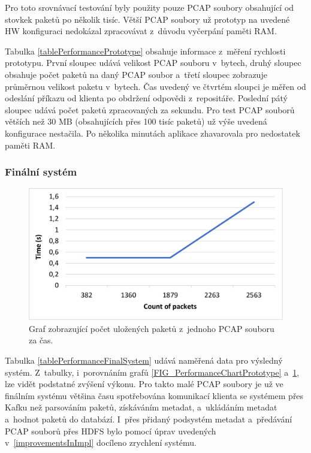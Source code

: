 \noindent Pro toto srovnávací testování byly použity pouze PCAP soubory obsahující od stovkek paketů po několik tisíc. Větší PCAP soubory už prototyp na uvedené HW konfiguraci nedokázal zpracovávat z~důvodu vyčerpání paměti RAM.

Tabulka \ref{tablePerformancePrototype} obsahuje informace z~měření rychlosti prototypu. První sloupec udává velikost PCAP souboru v~bytech, druhý sloupec obsahuje počet paketů na daný PCAP soubor a~třetí sloupec zobrazuje průměrnou velikost paketu v~bytech. Čas uvedený ve čtvrtém sloupci je měřen od odeslání příkazu od klienta po obdržení odpovědi z~repositáře. Poslední pátý sloupec udává počet paketů zpracovaných za sekundu. Pro test PCAP souborů větších než 30 MB (obsahujících přes 100 tisíc paketů) už výše uvedená konfigurace nestačila. Po několika minutách aplikace zhavarovala pro nedostatek paměti RAM.

\subsubsection{Finální systém}

\begin{figure}[!h]
    \centering
    \includegraphics[width=15cm]{template-fig/PerformanceChartFinal.pdf}
    \caption{Graf zobrazující počet uložených paketů z~jednoho PCAP souboru za čas.}
    \label{FIG_PerformanceChartFinalSystem}
\end{figure}

\noindent Tabulka \ref{tablePerformanceFinalSystem} udává naměřená data pro výsledný systém. Z~tabulky, i~porovnáním grafů \ref{FIG_PerformanceChartPrototype} a~\ref{FIG_PerformanceChartFinalSystem}, lze vidět podstatné zvýšení výkonu. Pro takto malé PCAP soubory je už ve finálním systému většina času spotřebována komunikací klienta se systémem přes Kafku než parsováním paketů, získáváním metadat, a~ukládáním metadat a~hodnot paketů do databází. I~přes přidaný podsystém metadat a~předávání PCAP souborů přes HDFS bylo pomocí úprav uvedených v~\ref{improvementsInImpl} docíleno zrychlení systému.

